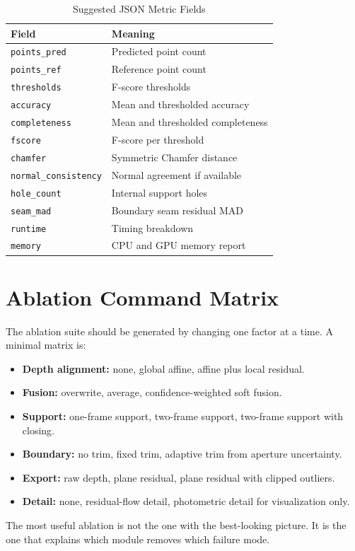 \documentclass[conference]{IEEEtran}
\begin{document}
\begin{table}[h]
\centering
\caption{Suggested JSON Metric Fields}
\begin{tabular}{ll}
\toprule
Field & Meaning \\
\midrule
\texttt{points\_pred} & Predicted point count \\
\texttt{points\_ref} & Reference point count \\
\texttt{thresholds} & F-score thresholds \\
\texttt{accuracy} & Mean and thresholded accuracy \\
\texttt{completeness} & Mean and thresholded completeness \\
\texttt{fscore} & F-score per threshold \\
\texttt{chamfer} & Symmetric Chamfer distance \\
\texttt{normal\_consistency} & Normal agreement if available \\
\texttt{hole\_count} & Internal support holes \\
\texttt{seam\_mad} & Boundary seam residual MAD \\
\texttt{runtime} & Timing breakdown \\
\texttt{memory} & CPU and GPU memory report \\
\bottomrule
\end{tabular}
\end{table}

\section{Ablation Command Matrix}
The ablation suite should be generated by changing one factor at a time. A minimal matrix is:
\begin{itemize}
\item \textbf{Depth alignment:} none, global affine, affine plus local residual.
\item \textbf{Fusion:} overwrite, average, confidence-weighted soft fusion.
\item \textbf{Support:} one-frame support, two-frame support, two-frame support with closing.
\item \textbf{Boundary:} no trim, fixed trim, adaptive trim from aperture uncertainty.
\item \textbf{Export:} raw depth, plane residual, plane residual with clipped outliers.
\item \textbf{Detail:} none, residual-flow detail, photometric detail for visualization only.
\end{itemize}
The most useful ablation is not the one with the best-looking picture. It is the one that explains which module removes which failure mode.
\end{document}
